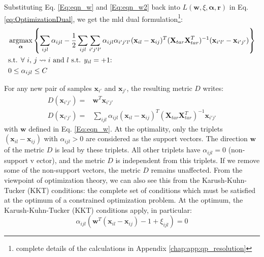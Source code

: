 \noindent Substituting Eq. \ref{Eq:eqn_w} and \ref{Eq:eqn_w2} back into $L(\textbf{w},\xi,\boldsymbol{\alpha},\textbf{r})$ in Eq. \ref{eq:OptimizationDual}, we get the {\sc mld} dual formulation\footnote{complete details of the calculations in Appendix \ref{chap:app:qp_resolution}}:
\begin{align}
&\displaystyle \argmax_{\boldsymbol{\alpha}} \left\lbrace 
\sum\limits_{ijl} \alpha_{ijl} 
- \frac{1}{2} \sum\limits_{ijl} \sum\limits_{i'j'l'}
\alpha_{ijl} \alpha_{i'j'l'}
(\textbf{x}_{il}-\textbf{x}_{ij})^T
(\textbf{X}_{tar} \textbf{X}_{tar}^T)^{-1}
(\textbf{x}_{i'l'}-\textbf{x}_{i'j'}) \right\rbrace \label{eq:OptimDual} \\
&\text{s.t. $\forall$ $i$, $j \rightsquigarrow i$ and $l$ s.t. $y_{il}=+1$:} \nonumber \\
& 0 \leq \alpha_{ijl} \leq C
\label{eq:OptimDualconstraint}
\end{align}

\noindent For any new pair of samples $\textbf{x}_{i'}$ and $\textbf{x}_{j'}$, the resulting metric $D$ writes: 
\begin{align}
D(\textbf{x}_{i'j'}) = & \textbf{w}^T \textbf{x}_{i'j'} \label{eq:D1} \\
D(\textbf{x}_{i'j'}) = & \sum\limits_{ijl} \alpha_{ijl} 
(\textbf{x}_{il}-\textbf{x}_{ij})^T
(\textbf{X}_{tar}\textbf{X}_{tar}^T)^{-1}
\textbf{x}_{i'j'}
\label{eq:D1_2}
\end{align}
with $\textbf{w}$ defined in Eq. \ref{Eq:eqn_w}. At the optimality, only the triplets $(\textbf{x}_{il}-\textbf{x}_{ij})$ with $\alpha_{ijl} > 0$ are considered as the support vectors. The direction $\textbf{w}$ of the metric $D$ is lead by these triplets. All other triplets have $\alpha_{ijl} = 0$ (non-support v ector), and the metric $D$ is independent from this triplets. If we remove some of the non-support vectors, the metric $D$ remains unaffected. From the viewpoint of optimization theory, we can also see this from the Karush-Kuhn-Tucker (KKT) conditions: the complete set of conditions which must be satisfied at the optimum of a constrained optimization problem. At the optimum, the Karush-Kuhn-Tucker (KKT) conditions apply, in particular:
\begin{equation*}
\alpha_{ijl} (\textbf{w}^T (\textbf{x}_{il}-\textbf{x}_{ij}) - 1 + \xi_{ijl}) = 0
\end{equation*}

